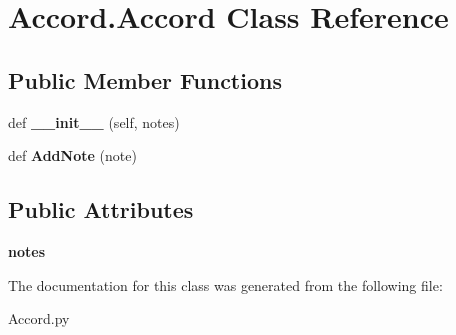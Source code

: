 \hypertarget{class_accord_1_1_accord}{}\section{Accord.\+Accord Class Reference}
\label{class_accord_1_1_accord}
\subsection*{Public Member Functions}
\begin{DoxyCompactItemize}
\item 
\mbox{\label{class_accord_1_1_accord_a04f0c5052196830f558a982cc642ba9b}} 
def {\bfseries \+\_\+\+\_\+init\+\_\+\+\_\+} (self, notes)
\item 
\mbox{\label{class_accord_1_1_accord_ab9756d17da429dcbacf50282691a7993}} 
def {\bfseries Add\+Note} (note)
\end{DoxyCompactItemize}
\subsection*{Public Attributes}
\begin{DoxyCompactItemize}
\item 
\mbox{\label{class_accord_1_1_accord_a1d7b1a6d6b2be29769d99a6160d466c8}} 
{\bfseries notes}
\end{DoxyCompactItemize}


The documentation for this class was generated from the following file\+:\begin{DoxyCompactItemize}
\item 
Accord.\+py\end{DoxyCompactItemize}
